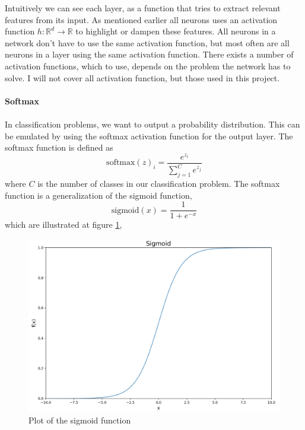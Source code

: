 \documentclass[11pt]{article}
\begin{document}
Intuitively we can see each layer, as a function that tries to extract relevant features from its input. As mentioned earlier all neurons uses an activation function $h : \mathbb{R}^{d} \rightarrow \mathbb{R}$ to highlight or dampen these features. All neurons in a network don't have to use the same activation function, but most often are all neurons in a layer using the same activation function. There exists a number of activation functions, which to use, depends on the problem the network has to solve. I will not cover all activation function, but those used in this project.
\\ \\
\textbf{Softmax}
\\ \\
In classification problems, we want to output a probability distribution. This can be emulated by using the softmax activation function for the output layer. The softmax function is defined as
\begin{equation}
    \text{softmax}(z)_{i} = \frac{e^{z_{i}}}{\sum_{j = 1}^{C} e^{z_{j}}}
\end{equation}
where $C$ is the number of classes in our classification problem. The softmax function is a generalization of the sigmoid function, 
\begin{equation}
    \text{sigmoid}(x) = \frac{1}{1 + e^{- x}}
\end{equation}
which are illustrated at figure \ref{fig:sigmoid},
\begin{figure}[!h]
    \centering
    \includegraphics[scale = 0.3]{figurer/deep_learning/sigmoid.png}
    \caption{Plot of the sigmoid function}
    \label{fig:sigmoid}
\end{figure}
\end{document}
